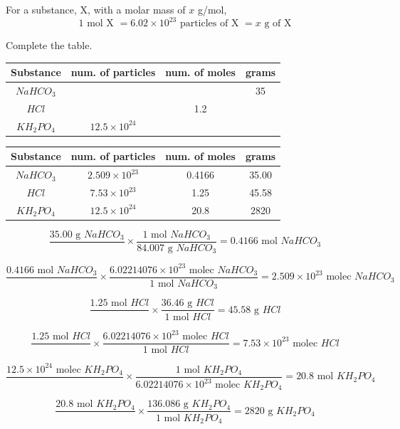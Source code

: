 \begin{mdframed}[frametitle = {The Mole Concept}, style = important]
For a substance, X, with a molar mass of $x$ g/mol,
$$1\text{ mol X } = 6.02 \times 10^{23}\text{ particles of X }= x\text{ g of X}$$
\end{mdframed}

\begin{Exercise}[title = {Grams, Moles, Molecules, and Atoms}, label = convert]
Complete the table.

\begin{tabular}{|c|c|c|c|}
\hline
Substance & num. of particles & num. of moles & grams\\\hline
$NaHCO_3$ & & & 35\\\hline
$HCl$ & & 1.2 & \\\hline
$KH_2PO_4$ & $12.5 \times 10^{24}$ & & \\\hline
\end{tabular}
\vspace{75mm}
\end{Exercise}

\begin{Answer}[ref = convert]
\begin{tabular}{|c|c|c|c|}
\hline
Substance & num. of particles & num. of moles & grams \\\hline
$NaHCO_3$ & $2.509 \times 10^{23}$ & 0.4166 & 35.00 \\\hline
$HCl$ & $7.53 \times 10^{23}$ & 1.25 & 45.58 \\\hline
$KH_2PO_4$ & $12.5 \times 10^{24}$ & 20.8 & 2820 \\\hline
\end{tabular}

$$\frac{35.00\text{ g }NaHCO_3}{} \times 
\frac{1\text{ mol } NaHCO_3}{84.007\text{ g }NaHCO_3} = 0.4166\text{ mol }NaHCO_3$$

$$\frac{0.4166\text{ mol }NaHCO_3}{} \times \frac{6.02214076 
\times 10^{23}\text{ molec }NaHCO_3}{1\text{ mol }NaHCO_3} = 
2.509 \times 10^{23}\text{ molec }NaHCO_3$$

$$\frac{1.25\text{ mol }HCl}{} \times 
\frac{36.46\text{ g }HCl}{1\text{ mol }HCl} = 45.58\text{ g }HCl$$

$$\frac{1.25\text{ mol }HCl}{} \times 
\frac{6.02214076 \times 10^{23}\text{ molec }HCl}{1\text{ mol }HCl} 
= 7.53 \times 10^{23}\text{ molec }HCl$$

$$\frac{12.5 \times 10^{24}\text{ molec }KH_2PO_4}{} \times 
\frac{1\text{ mol }KH_2PO_4}{6.02214076 \times 10^{23}\text{ molec }KH_2PO_4} 
= 20.8\text{ mol }KH_2PO_4$$

$$\frac{20.8\text{ mol }KH_2PO_4}{} \times 
\frac{136.086\text{ g }KH_2PO_4}{1\text{ mol }KH_2PO_4} = 
2820\text{ g }KH_2PO_4$$
\end{Answer}


